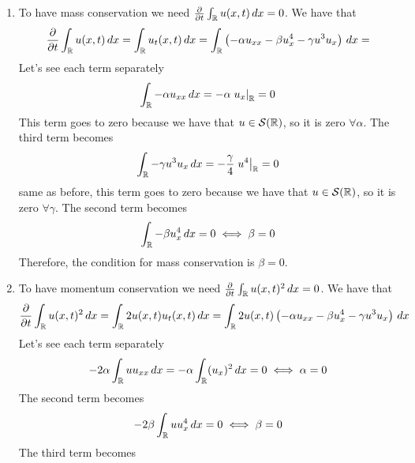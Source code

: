 \begin{enumerate}
    \item To have mass conservation we need \(\frac{\partial}{\partial t}\int_{\mathbb{R}} u(x,t) \, dx = 0\). We have that
    \[
        \begin{split}
            \frac{\partial}{\partial t}\int_{\mathbb{R}} u(x,t) \, dx = \int_{\mathbb{R}} u_t(x,t) \, dx = \int_{\mathbb{R}} \left(- \alpha u_{xx} - \beta u_{x}^4 - \gamma u^3u_x\right) \, dx = 
        \end{split}
    \]
    Let's see each term separately
    \[
        \begin{split}
            \int_{\mathbb{R}} - \alpha u_{xx} \, dx = -\alpha \left.u_x\right|_{\mathbb{R}} = 0
        \end{split}
    \]
    This term goes to zero because we have that \(u \in \mathcal{S}(\mathbb{R})\), so it is zero \(\forall \alpha\). The third term becomes
    \[
        \begin{split}
            \int_{\mathbb{R}} - \gamma u^3u_x \, dx = -\frac{\gamma}{4} \left. u^4 \right|_{\mathbb{R}} = 0
        \end{split}
    \]
    same as before, this term goes to zero because we have that \(u \in \mathcal{S}(\mathbb{R})\), so it is zero \(\forall \gamma\). The second term becomes
    \[
        \begin{split}
            \int_{\mathbb{R}} - \beta u_{x}^4 \, dx = 0 \iff \beta = 0
        \end{split}
    \]
    Therefore, the condition for mass conservation is \(\beta = 0\).
    \item To have momentum conservation we need \(\frac{\partial}{\partial t}\int_{\mathbb{R}} u(x,t)^2 \, dx = 0\). We have that
    \[
        \begin{split}
            \frac{\partial}{\partial t}\int_{\mathbb{R}} u(x,t)^2 \, dx = \int_{\mathbb{R}} 2u(x,t)u_t(x,t) \, dx = \int_{\mathbb{R}} 2u(x,t)\left(- \alpha u_{xx} - \beta u_{x}^4 - \gamma u^3u_x\right) \, dx 
        \end{split}
    \]
    Let's see each term separately
    \[
        \begin{split}
            -2\alpha \int_{\mathbb{R}} u u_{xx} \, dx = -\alpha \int_{\mathbb{R}} (u_x)^2 \, dx = 0 \iff \alpha = 0
        \end{split}
    \]
    The second term becomes
    \[
        \begin{split}
            -2\beta \int_{\mathbb{R}} u u_{x}^4 \, dx = 0 \iff \beta = 0
        \end{split}
    \]
    The third term becomes
    \[
        \begin{split}

\end{split}\]
\end{enumerate}
